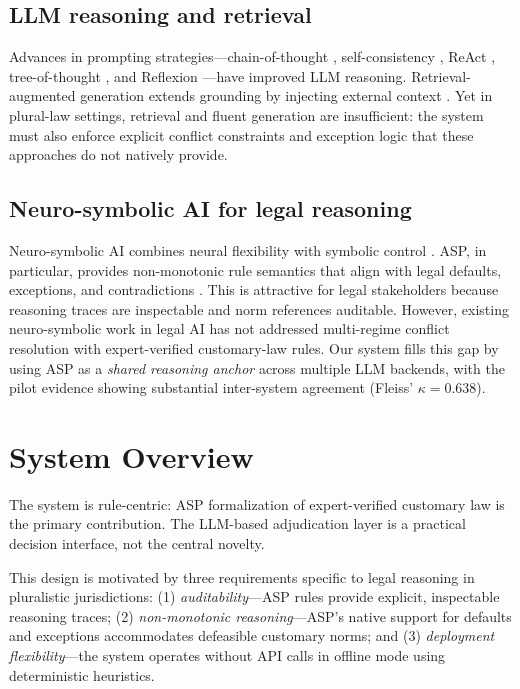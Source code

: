\documentclass[pdflatex,sn-basic,Numbered]{sn-jnl}
\begin{document}
\subsection{LLM reasoning and retrieval}\label{subsec:llm}

Advances in prompting strategies---chain-of-thought \cite{wei2022cot}, self-consistency \cite{wang2022selfconsistency}, ReAct \cite{yao2023react}, tree-of-thought \cite{yao2023tree}, and Reflexion \cite{shinn2023reflexion}---have improved LLM reasoning.
Retrieval-augmented generation extends grounding by injecting external context \cite{lewis2020rag,asai2023selfrag,gao2023ragsurvey,sarthi2024raptor,he2024gretriever}.
Yet in plural-law settings, retrieval and fluent generation are insufficient: the system must also enforce explicit conflict constraints and exception logic that these approaches do not natively provide.

\subsection{Neuro-symbolic AI for legal reasoning}\label{subsec:neurosym}

Neuro-symbolic AI combines neural flexibility with symbolic control \cite{garcez2023neurosymbolic}.
ASP, in particular, provides non-monotonic rule semantics that align with legal defaults, exceptions, and contradictions \cite{lifschitz2019asp,gebser2014clingo}.
This is attractive for legal stakeholders because reasoning traces are inspectable and norm references auditable.
However, existing neuro-symbolic work in legal AI has not addressed multi-regime conflict resolution with expert-verified customary-law rules.
Our system fills this gap by using ASP as a \textit{shared reasoning anchor} across multiple LLM backends, with the pilot evidence showing substantial inter-system agreement (Fleiss' $\kappa = 0.638$).

\section{System Overview}\label{sec:system}

The system is rule-centric: ASP formalization of expert-verified customary law is the primary contribution.
The LLM-based adjudication layer is a practical decision interface, not the central novelty.

This design is motivated by three requirements specific to legal reasoning in pluralistic jurisdictions: (1) \textit{auditability}---ASP rules provide explicit, inspectable reasoning traces; (2) \textit{non-monotonic reasoning}---ASP's native support for defaults and exceptions accommodates defeasible customary norms; and (3) \textit{deployment flexibility}---the system operates without API calls in offline mode using deterministic heuristics.
\end{document}
